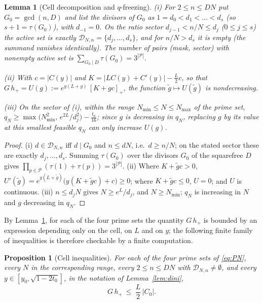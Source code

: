 \documentclass[11pt]{article}
\newtheorem{lemma}[theorem]{Lemma}
\newtheorem{proposition}[theorem]{Proposition}
\theoremstyle{definition}
\newcommand{\calP}{\mathcal{P}}
\begin{document}
\begin{lemma}[Cell decomposition and $q$-freezing]\label{lem:cells}
\textup{(i)} For $2\le n\le DN$ put $G_0=\gcd(n,D)$ and list the
divisors of $G_0$ as $1=d_0<d_1<\dots<d_s$ (so $s+1=\tau(G_0)$),
with $d_{-1}=0$. On the ratio sector $d_{j-1}<n/N\le d_j$
($0\le j\le s$) the active set is exactly
$\mathcal D_{N,n}=\{d_j,\dots,d_s\}$, and for $n/N>d_s$ it is
empty (the summand vanishes identically). The number of pairs
(mask, sector) with nonempty active set is
$\sum_{G_0\mid D}\tau(G_0)=3^{|\calP|}$.

\textup{(ii)} With $c=|C(y)|$ and
$K=|LC(y)+C'(y)|-\frac L2c$, so that
$G\,h_+=U(g):=e^{y(L+g)}\,[K+gc]_+$, the function
$\tilde g\mapsto U(\tilde g)$ is nondecreasing.

\textup{(iii)} On the sector of \textup{(i)}, within the range
$N_{\min}\le N\le N_{\max}$ of the prime set,
$q_N\ge\max\bigl(N_{\min}^2,\,e^{2L}/d_j^2\bigr)-\frac{t_0}{16}$;
since $g$ is decreasing in $q_N$, replacing $g$ by its value at
this smallest feasible $q_N$ can only increase $U(g)$.
\end{lemma}

\begin{proof}
(i) $d\in\mathcal D_{N,n}$ iff $d\mid G_0$ and $n\le dN$, i.e.\
$d\ge n/N$; on the stated sector these are exactly
$d_j,\dots,d_s$. Summing $\tau(G_0)$ over the divisors $G_0$ of the
squarefree $D$ gives $\prod_{p\in\calP}(\tau(1)+\tau(p))
=3^{|\calP|}$. (ii) Where $K+\tilde gc>0$,
$U'(\tilde g)=e^{y(L+\tilde g)}\bigl(y(K+\tilde gc)+c\bigr)\ge0$;
where $K+\tilde gc\le0$, $U=0$; and $U$ is continuous. (iii)
$n\le d_jN$ gives $N\ge e^L/d_j$, and $N\ge N_{\min}$; $q_N$ is
increasing in $N$ and $g$ decreasing in $q_N$.
\end{proof}

By Lemma~\ref{lem:cells}, for each of the four prime sets the
quantity $G\,h_+$ is bounded by an expression depending only on the
cell, on $L$ and on $y$; the following finite family of
inequalities is therefore checkable by a finite computation.

\begin{proposition}[Cell inequalities]\label{prop:dinicells}
For each of the four prime sets of \eqref{eq:PN}, every $N$ in the
corresponding range, every $2\le n\le DN$ with
$\mathcal D_{N,n}\neq\emptyset$, and every
$y\in[y_0,\sqrt{1-2t_0}]$, in the notation of
Lemma~\ref{lem:dini},
\[
G\,h_+\ \le\ \frac L2\,|C_0| .
\]
\end{proposition}
\end{document}
